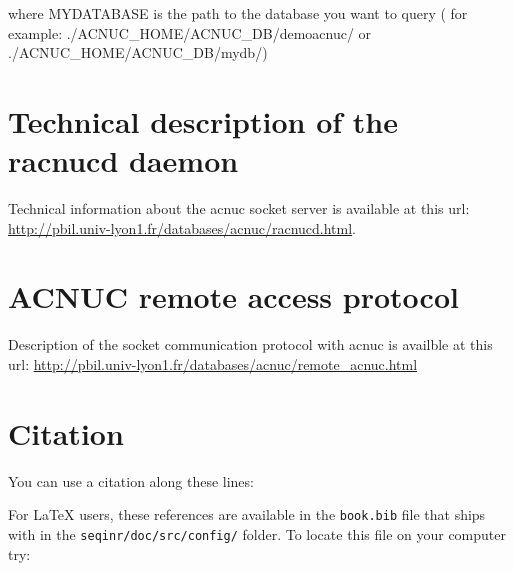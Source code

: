 \documentclass{article}
\begin{document}
where MYDATABASE is the path to the database you want to query ( for example: ./ACNUC\_HOME/ACNUC\_DB/demoacnuc/
 or ./ACNUC\_HOME/ACNUC\_DB/mydb/)
  
 




\section{Technical description of the racnucd daemon}
Technical information about the acnuc socket server is available at this url:
\url{http://pbil.univ-lyon1.fr/databases/acnuc/racnucd.html}.

\section{ACNUC remote access protocol}
Description of the socket communication protocol with acnuc is availble at this url:
\url{http://pbil.univ-lyon1.fr/databases/acnuc/remote_acnuc.html}




\section{Citation} 

You can use a citation along these lines:

\vspace{0.2cm}

\noindent{}

\vspace{0.2cm}

For \LaTeX{} users, these references are available in the \texttt{book.bib} file that ships
with \seqinr{} in the \texttt{seqinr/doc/src/config/} folder. To locate this file on your
computer try:
\end{document}
